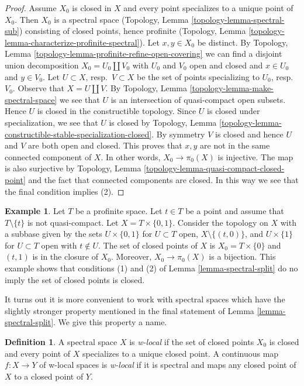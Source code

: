 \documentclass{stacks-project}
\theoremstyle{plain}
\theoremstyle{definition}
\newtheorem{definition}[subsection]{Definition}
\newtheorem{example}[subsection]{Example}
\theoremstyle{remark}
\numberwithin{equation}{subsection}
\begin{document}
\begin{proof}
\medskip\noindent
Assume $X_0$ is closed in $X$ and every point specializes to a unique
point of $X_0$. Then $X_0$ is a spectral space
(Topology, Lemma \ref{topology-lemma-spectral-sub})
consisting of closed points, hence profinite
(Topology, Lemma \ref{topology-lemma-characterize-profinite-spectral}).
Let $x, y \in X_0$ be distinct. By
Topology, Lemma \ref{topology-lemma-profinite-refine-open-covering}
we can find a disjoint union decomposition
$X_0 = U_0 \amalg V_0$ with $U_0$ and $V_0$ open and closed
and $x \in U_0$ and $y \in V_0$.
Let $U \subset X$, resp.\ $V \subset X$
be the set of points specializing to $U_0$, resp.\ $V_0$.
Observe that $X = U \amalg V$.
By Topology, Lemma \ref{topology-lemma-make-spectral-space}
we see that $U$ is an intersection of quasi-compact open subsets.
Hence $U$ is closed in the constructible topology.
Since $U$ is closed under specialization, we see that
$U$ is closed by Topology, Lemma
\ref{topology-lemma-constructible-stable-specialization-closed}.
By symmetry $V$ is closed and hence $U$ and $V$ are both
open and closed.
This proves that $x, y$ are not in the same connected component of $X$.
In other words, $X_0 \to \pi_0(X)$ is injective. The map is also
surjective by
Topology, Lemma \ref{topology-lemma-quasi-compact-closed-point}
and the fact that connected components are closed.
In this way we see that the final condition implies (2).
\end{proof}

\begin{example}
\label{example-not-w-local}
Let $T$ be a profinite space. Let $t \in T$ be a point and assume
that $T \setminus \{t\}$ is not quasi-compact.
Let $X = T \times \{0, 1\}$. Consider the topology on $X$
with a subbase given by the sets
$U \times \{0, 1\}$ for $U \subset T$ open, $X \setminus \{(t, 0)\}$,
and $U \times \{1\}$ for $U \subset T$ open with $t \not \in U$.
The set of closed points of $X$ is $X_0 = T \times \{0\}$ and
$(t, 1)$ is in the closure of $X_0$.
Moreover, $X_0 \to \pi_0(X)$ is a bijection.
This example shows that conditions (1) and (2) of
Lemma \ref{lemma-spectral-split} do no imply the set of closed points
is closed.
\end{example}

\noindent
It turns out it is more convenient to work with spectral
spaces which have the slightly stronger property mentioned in
the final statement of Lemma \ref{lemma-spectral-split}.
We give this property a name.

\begin{definition}
\label{definition-w-local}
A spectral space $X$ is {\it w-local} if the set of closed points $X_0$
is closed and every point of $X$ specializes to a unique closed point.
A continuous map $f : X \to Y$ of w-local spaces is {\it w-local}
if it is spectral and maps any closed point of $X$ to a closed point of $Y$.
\end{definition}
\end{document}
